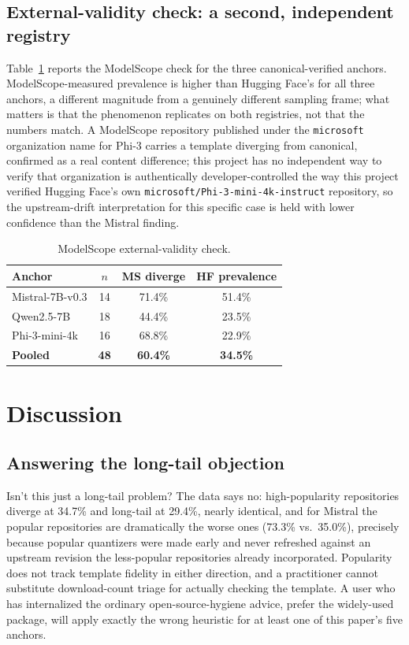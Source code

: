 \documentclass[letterpaper,twocolumn,10pt]{article}
\begin{document}
\subsection{External-validity check: a second, independent registry}

Table~\ref{tab:modelscope} reports the ModelScope check for the three canonical-verified anchors. ModelScope-measured prevalence is higher than Hugging Face's for all three anchors, a different magnitude from a genuinely different sampling frame; what matters is that the phenomenon replicates on both registries, not that the numbers match. A ModelScope repository published under the \texttt{microsoft} organization name for Phi-3 carries a template diverging from canonical, confirmed as a real content difference; this project has no independent way to verify that organization is authentically developer-controlled the way this project verified Hugging Face's own \texttt{microsoft/Phi-3-mini-4k-instruct} repository, so the upstream-drift interpretation for this specific case is held with lower confidence than the Mistral finding.

\begin{table}[t]
\caption{ModelScope external-validity check.}
\label{tab:modelscope}
\centering
\small
\begin{tabular}{lccc}
\toprule
Anchor & $n$ & MS diverge & HF prevalence \\
\midrule
Mistral-7B-v0.3 & 14 & 71.4\% & 51.4\% \\
Qwen2.5-7B & 18 & 44.4\% & 23.5\% \\
Phi-3-mini-4k & 16 & 68.8\% & 22.9\% \\
\midrule
\textbf{Pooled} & \textbf{48} & \textbf{60.4\%} & \textbf{34.5\%} \\
\bottomrule
\end{tabular}
\end{table}

\section{Discussion}
\label{sec:discussion}

\subsection{Answering the long-tail objection}

Isn't this just a long-tail problem? The data says no: high-popularity repositories diverge at 34.7\% and long-tail at 29.4\%, nearly identical, and for Mistral the popular repositories are dramatically the worse ones (73.3\% vs.\ 35.0\%), precisely because popular quantizers were made early and never refreshed against an upstream revision the less-popular repositories already incorporated. Popularity does not track template fidelity in either direction, and a practitioner cannot substitute download-count triage for actually checking the template. A user who has internalized the ordinary open-source-hygiene advice, prefer the widely-used package, will apply exactly the wrong heuristic for at least one of this paper's five anchors.
\end{document}

